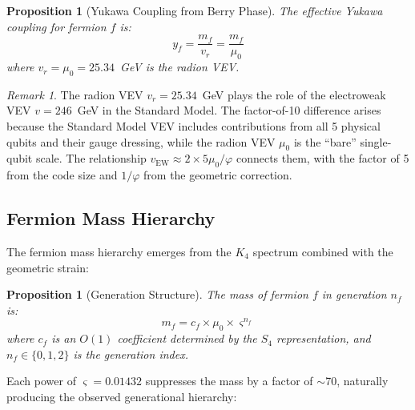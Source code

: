 \documentclass[11pt,a4paper]{article}
\newtheorem{proposition}[theorem]{Proposition}
\theoremstyle{definition}
\theoremstyle{remark}
\newtheorem{remark}[theorem]{Remark}
\newcommand{\strain}{\varsigma}
\newcommand{\gr}{\varphi}
\newcommand{\murad}{\mu_0}
\begin{document}
\begin{proposition}[Yukawa Coupling from Berry Phase]
\label{prop:yukawa}
The effective Yukawa coupling for fermion $f$ is:
\begin{equation}
y_f = \frac{m_f}{v_r} = \frac{m_f}{\murad}
\end{equation}
where $v_r = \murad = 25.34$~GeV is the radion VEV.
\end{proposition}

\begin{remark}
The radion VEV $v_r = 25.34$~GeV plays the role of the electroweak VEV $v = 246$~GeV in the Standard Model. The factor-of-10 difference arises because the Standard Model VEV includes contributions from all 5 physical qubits and their gauge dressing, while the radion VEV $\murad$ is the ``bare'' single-qubit scale. The relationship $v_{\mathrm{EW}} \approx 2 \times 5\murad/\gr$ connects them, with the factor of 5 from the code size and $1/\gr$ from the geometric correction.
\end{remark}

\subsection{Fermion Mass Hierarchy}

The fermion mass hierarchy emerges from the $K_4$ spectrum combined with the geometric strain:

\begin{proposition}[Generation Structure]
\label{prop:generations}
The mass of fermion $f$ in generation $n_f$ is:
\begin{equation}
m_f = c_f \times \murad \times \strain^{n_f}
\end{equation}
where $c_f$ is an $O(1)$ coefficient determined by the $S_4$ representation, and $n_f \in \{0, 1, 2\}$ is the generation index.
\end{proposition}

Each power of $\strain = 0.01432$ suppresses the mass by a factor of $\sim$70, naturally producing the observed generational hierarchy:
\end{document}
